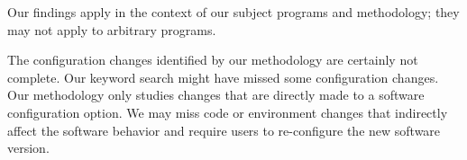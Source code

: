 Our findings apply in the context of our subject programs and methodology;
they may not apply to arbitrary programs.

The configuration changes identified by our methodology are
certainly not complete. Our keyword search might have missed some configuration changes.
Our methodology only studies changes that are directly made to a
software configuration option. We may miss
code or environment changes that indirectly affect the software behavior
and require users to re-configure the new software version.




